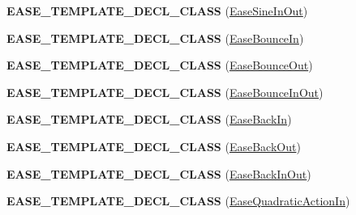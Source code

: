 \begin{DoxyCompactItemize}
\mbox{\label{group__actions_ga6d8ef17866e7e13e8936889ec5b918af}} 
{\bfseries E\+A\+S\+E\+\_\+\+T\+E\+M\+P\+L\+A\+T\+E\+\_\+\+D\+E\+C\+L\+\_\+\+C\+L\+A\+SS} (\hyperlink{classEaseSineInOut}{Ease\+Sine\+In\+Out})
\item 
\mbox{\label{group__actions_gaa0f34f907de8e63af3d4080436b9c435}} 
{\bfseries E\+A\+S\+E\+\_\+\+T\+E\+M\+P\+L\+A\+T\+E\+\_\+\+D\+E\+C\+L\+\_\+\+C\+L\+A\+SS} (\hyperlink{classEaseBounceIn}{Ease\+Bounce\+In})
\item 
\mbox{\label{group__actions_gac7089127870595ea038aea58b1964d94}} 
{\bfseries E\+A\+S\+E\+\_\+\+T\+E\+M\+P\+L\+A\+T\+E\+\_\+\+D\+E\+C\+L\+\_\+\+C\+L\+A\+SS} (\hyperlink{classEaseBounceOut}{Ease\+Bounce\+Out})
\item 
\mbox{\label{group__actions_ga7d0aa671b2b23cfa57bdb2e93b5b9472}} 
{\bfseries E\+A\+S\+E\+\_\+\+T\+E\+M\+P\+L\+A\+T\+E\+\_\+\+D\+E\+C\+L\+\_\+\+C\+L\+A\+SS} (\hyperlink{classEaseBounceInOut}{Ease\+Bounce\+In\+Out})
\item 
\mbox{\label{group__actions_gacdb3b69481f0317ae78ba02b487ddd96}} 
{\bfseries E\+A\+S\+E\+\_\+\+T\+E\+M\+P\+L\+A\+T\+E\+\_\+\+D\+E\+C\+L\+\_\+\+C\+L\+A\+SS} (\hyperlink{classEaseBackIn}{Ease\+Back\+In})
\item 
\mbox{\label{group__actions_ga523a5498cd9d47ad7a998cfb4b50f064}} 
{\bfseries E\+A\+S\+E\+\_\+\+T\+E\+M\+P\+L\+A\+T\+E\+\_\+\+D\+E\+C\+L\+\_\+\+C\+L\+A\+SS} (\hyperlink{classEaseBackOut}{Ease\+Back\+Out})
\item 
\mbox{\label{group__actions_gafc2b46b2f94ba6dd5c5b188cfa8dc443}} 
{\bfseries E\+A\+S\+E\+\_\+\+T\+E\+M\+P\+L\+A\+T\+E\+\_\+\+D\+E\+C\+L\+\_\+\+C\+L\+A\+SS} (\hyperlink{classEaseBackInOut}{Ease\+Back\+In\+Out})
\item 
\mbox{\label{group__actions_ga6a4168ba499e28a850a0da570a9551a4}} 
{\bfseries E\+A\+S\+E\+\_\+\+T\+E\+M\+P\+L\+A\+T\+E\+\_\+\+D\+E\+C\+L\+\_\+\+C\+L\+A\+SS} (\hyperlink{classEaseQuadraticActionIn}{Ease\+Quadratic\+Action\+In})
\item 
\mbox{\label{group__actions_gaa003f32d8f6b4d064f84b8985ab0d594}} 

\end{DoxyCompactItemize}
